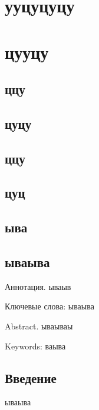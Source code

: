 \documentclass{article}%
\begin{document}
%
\pagestyle{empty}%
\normalsize%
%
\fontsize{12}{12pt}\selectfont%
\begin{center}%
\section*{ууцуцуцу}%
\label{sec:}%

%
\section*{цууцу}%
\label{sec:}%

%
\subsection*{ццу}%
\label{subsec:}%

%
\subsection*{цуцу}%
\label{subsec:}%

%
\subsection*{ццу}%
\label{subsec:}%

%
\subsection*{цуц}%
\label{subsec:}%

%
\subsection*{ыва}%
\label{subsec:}%

%
\subsection*{ываыва}%
\label{subsec:}%

%
\end{center}%
\par%
Аннотация. ываыв%
\newline%
\par%
Ключевые слова: ываыва%
\newline%
\par%
Abstract. ываываы%
\newline%
\par%
Keywords: ваыва%
\newline%
\subsection*{Введение}%
\label{subsec:}%
ываыва
\end{document}
